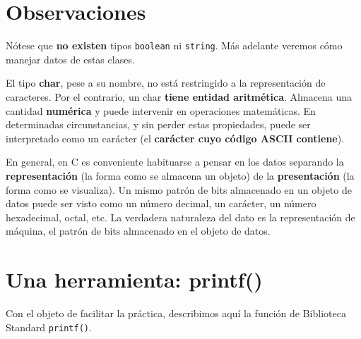 \section{Observaciones}
Nótese que \textbf{no existen} tipos \lstinline{boolean} ni \lstinline{string}. Más adelante veremos cómo manejar datos de
estas clases.

El tipo \textbf{char}, pese a su nombre, no está restringido a la representación de caracteres. Por el contrario,
un char \textbf{tiene entidad aritmética}. Almacena una cantidad \textbf{numérica} y puede intervenir en
operaciones matemáticas. En determinadas circunstancias, y sin perder estas propiedades, puede
ser interpretado como un carácter (el \textbf{carácter cuyo código ASCII contiene}).

En general, en C es conveniente habituarse a pensar en los datos separando la \textbf{representación} (la
forma como se almacena un objeto) de la \textbf{presentación} (la forma como se visualiza). Un mismo
patrón de bits almacenado en un objeto de datos puede ser visto como un número decimal, un
carácter, un número hexadecimal, octal, etc. La verdadera naturaleza del dato es la representación
de máquina, el patrón de bits almacenado en el objeto de datos.


\section{Una herramienta: printf()}
\label{sec:lafuncionprintf}
Con el objeto de facilitar la práctica, describimos aquí la función de Biblioteca Standard \lstinline{printf()}.


